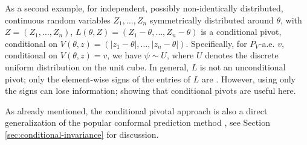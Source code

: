 \documentclass[english]{article}
\begin{document}
As a second example, 
for independent, possibly non-identically distributed, continuous random variables $Z_1,\ldots,Z_n$ symmetrically distributed around $\theta$, with $Z=(Z_1,\ldots,Z_n)$, $L(\theta,Z)=(Z_1-\theta,\ldots,Z_n-\theta)$ is a conditional pivot, 
conditional on $V(\theta,z) = (|z_1-\theta|,\ldots,|z_n-\theta|)$.
Specifically, 
for $P_V$-a.e. $v$,
conditional on  $V(\theta,z)=v$,
we have $\psi \sim U$, where $U$ denotes the  discrete uniform distribution on the unit cube. 
In general, $L$ is not an unconditional pivot; only the element-wise signs of the entries of $L$ are \citep{boldin1997sign}.
However, using only the signs can lose information;  showing that conditional pivots are useful here.


As already mentioned, the conditional pivotal approach is also a direct generalization of the popular conformal prediction method \citep{gammerman1998learning,vovk1999machine,vovk2022algorithmic},
see Section \ref{sec:conditional-invariance} for discussion. 
\end{document}
